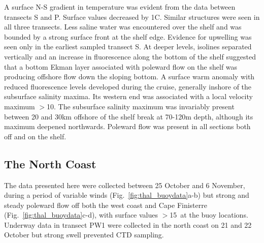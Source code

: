 A surface N-S gradient in temperature was evident from the data
between transects S and P. Surface values decreased by 1\deg C.
Similar structures were seen in all three transects. Less saline
water was encountered over the shelf and was bounded by a strong
surface front at the shelf edge. Evidence for upwelling was seen
only in the earliest sampled transect S. At deeper levels,
isolines separated vertically and an increase in fluorescence
along the bottom of the shelf suggested that a bottom Ekman layer
associated with poleward flow on the shelf was producing offshore
flow down the sloping bottom. A surface warm anomaly with reduced
fluorescence levels developed during the cruise, generally inshore
of the subsurface salinity maxima. Its western end was associated
with a local velocity maximum $>$10\velc. The subsurface salinity
maximum was invariably present between 20 and 30km offshore of the
shelf break at 70-120m depth, although its maximum deepened
northwards. Poleward flow was present in all sections both off and
on the shelf.

\subsection{The North Coast}
The data presented here were collected between 25 October and 6
November, during a period of variable winds
(Fig.~\ref{fig:thal_buoydata}a-b) but strong and steady poleward
flow off both the west coast and Cape Finisterre
(Fig.~\ref{fig:thal_buoydata}c-d), with surface values
$>$15\velc\, at the buoy locations. Underway data in transect PW1
were collected in the north coast on 21 and 22 October but strong
swell prevented CTD sampling.

